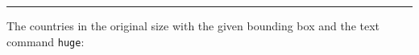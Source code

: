 \documentclass{article}
\newcounter{N}
\begin{document}
\noindent\rule{\textwidth}{.5mm}

The countries in the original size with the given bounding box and the text command \verb|huge|:

\medskip

\begingroup
\fboxsep=0pt
\setcounter{N}{128}
\huge\noindent%
\CountriesOfEuropeFamily%
\endgroup
\end{document}
